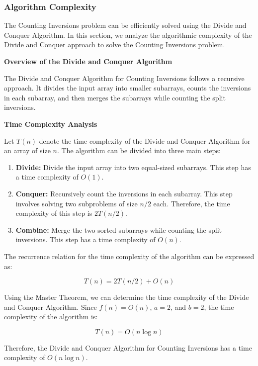 \documentclass[12pt]{book} %
\begin{document}
\subsubsection{Algorithm Complexity}

The Counting Inversions problem can be efficiently solved using the Divide and Conquer Algorithm. In this section, we analyze the algorithmic complexity of the Divide and Conquer approach to solve the Counting Inversions problem.

\textbf{Overview of the Divide and Conquer Algorithm}

The Divide and Conquer Algorithm for Counting Inversions follows a recursive approach. It divides the input array into smaller subarrays, counts the inversions in each subarray, and then merges the subarrays while counting the split inversions.

\textbf{Time Complexity Analysis}

Let $T(n)$ denote the time complexity of the Divide and Conquer Algorithm for an array of size $n$. The algorithm can be divided into three main steps:

\begin{enumerate}
    \item \textbf{Divide:} Divide the input array into two equal-sized subarrays. This step has a time complexity of $O(1)$.
    
    \item \textbf{Conquer:} Recursively count the inversions in each subarray. This step involves solving two subproblems of size $n/2$ each. Therefore, the time complexity of this step is $2T(n/2)$.
    
    \item \textbf{Combine:} Merge the two sorted subarrays while counting the split inversions. This step has a time complexity of $O(n)$.
\end{enumerate}

The recurrence relation for the time complexity of the algorithm can be expressed as:

\[
T(n) = 2T(n/2) + O(n)
\]

Using the Master Theorem, we can determine the time complexity of the Divide and Conquer Algorithm. Since $f(n) = O(n)$, $a = 2$, and $b = 2$, the time complexity of the algorithm is:

\[
T(n) = O(n \log n)
\]

Therefore, the Divide and Conquer Algorithm for Counting Inversions has a time complexity of $O(n \log n)$.
\end{document}
